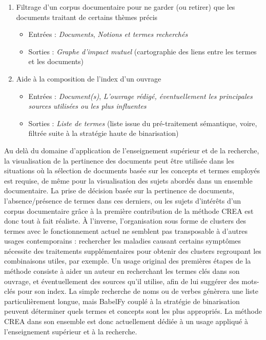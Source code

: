 \begin{enumerate}
\item Filtrage d'un corpus documentaire pour ne garder (ou retirer) que les documents traitant de certains thèmes précis
	\begin{itemize}
	\item Entrées : \textit{Documents}, \textit{Notions et termes recherchés}
	\item Sorties : \textit{Graphe d'impact mutuel} (cartographie des liens entre les termes et les documents)
	\end{itemize}

\item Aide à la composition de l'index d'un ouvrage
	\begin{itemize}
	\item Entrées : \textit{Document(s)}, \textit{L'ouvrage rédigé, éventuellement les principales sources utilisées ou les plus influentes}
	\item Sorties : \textit{Liste de termes} (liste issue du pré-traitement sémantique, voire, filtrée suite à la stratégie haute de binarisation)
	\end{itemize}

\end{enumerate}

\bigskip

Au delà du domaine d'application de l'enseignement supérieur et de la recherche, la visualisation de la pertinence des documents peut être utilisée dans les situations où la sélection de documents basée sur les concepts et termes employés est requise, de même pour la visualisation des sujets abordés dans un ensemble documentaire.
La prise de décision basée sur la pertinence de documents, l'absence/présence de termes dans ces derniers, ou les sujets d'intérêts d'un corpus documentaire grâce à la première contribution de la méthode CREA est donc tout à fait réaliste.
À l'inverse, l'organisation sous forme de clusters des termes avec le fonctionnement actuel ne semblent pas transposable à d'autres usages contemporains : rechercher les maladies causant certains symptômes nécessite des traitements supplémentaires pour obtenir des clusters regroupant les combinaisons utiles, par exemple.
Un usage original des premières étapes de la méthode consiste à aider un auteur en recherchant les termes clés dans son ouvrage, et éventuellement des sources qu'il utilise, afin de lui suggérer des mots-clés pour son index.
La simple recherche de noms ou de verbes génèrera une liste particulièrement longue, mais BabelFy couplé à la stratégie de binarisation peuvent déterminer quels termes et concepts sont les plus appropriés.
La méthode CREA dans son ensemble est donc actuellement dédiée à un usage appliqué à l'enseignement supérieur et à la recherche.

